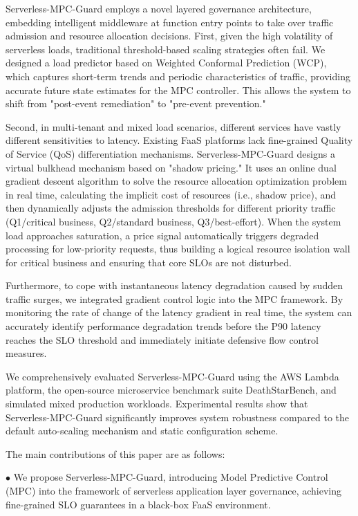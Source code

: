 \documentclass[journal]{IEEEtran}
\begin{document}
Serverless-MPC-Guard employs a novel layered governance architecture, embedding intelligent middleware at function entry points to take over traffic admission and resource allocation decisions. First, given the high volatility of serverless loads, traditional threshold-based scaling strategies often fail. We designed a load predictor based on Weighted Conformal Prediction (WCP), which captures short-term trends and periodic characteristics of traffic, providing accurate future state estimates for the MPC controller. This allows the system to shift from "post-event remediation" to "pre-event prevention."

Second, in multi-tenant and mixed load scenarios, different services have vastly different sensitivities to latency. Existing FaaS platforms lack fine-grained Quality of Service (QoS) differentiation mechanisms. Serverless-MPC-Guard designs a virtual bulkhead mechanism based on "shadow pricing." It uses an online dual gradient descent algorithm to solve the resource allocation optimization problem in real time, calculating the implicit cost of resources (i.e., shadow price), and then dynamically adjusts the admission thresholds for different priority traffic (Q1/critical business, Q2/standard business, Q3/best-effort). When the system load approaches saturation, a price signal automatically triggers degraded processing for low-priority requests, thus building a logical resource isolation wall for critical business and ensuring that core SLOs are not disturbed.

Furthermore, to cope with instantaneous latency degradation caused by sudden traffic surges, we integrated gradient control logic into the MPC framework. By monitoring the rate of change of the latency gradient in real time, the system can accurately identify performance degradation trends before the P90 latency reaches the SLO threshold and immediately initiate defensive flow control measures.

We comprehensively evaluated Serverless-MPC-Guard using the AWS Lambda platform, the open-source microservice benchmark suite DeathStarBench, and simulated mixed production workloads. Experimental results show that Serverless-MPC-Guard significantly improves system robustness compared to the default auto-scaling mechanism and static configuration scheme.

The main contributions of this paper are as follows:

$\bullet$ We propose Serverless-MPC-Guard, introducing Model Predictive Control (MPC) into the framework of serverless application layer governance, achieving fine-grained SLO guarantees in a black-box FaaS environment.
\end{document}
